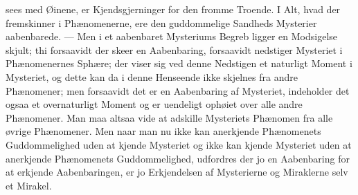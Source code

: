 \documentclass[12pt]{book}
\begin{document}
sees med Øinene, er Kjendsgjerninger for den fromme Troende. I Alt, hvad der
fremskinner i Phænomenerne, ere den guddommelige Sandheds Mysterier
aabenbarede. --- Men i et aabenbaret Mysteriums Begreb ligger en Modsigelse
skjult; thi forsaavidt der skeer en Aabenbaring, forsaavidt nedstiger
Mysteriet i Phænomenernes Sphære; der viser sig ved denne Nedstigen et
naturligt Moment i Mysteriet, og dette kan da i denne Henseende ikke skjelnes
fra andre Phænomener; men forsaavidt det er en Aabenbaring af Mysteriet,
indeholder det ogsaa et overnaturligt Moment og er uendeligt ophøiet over
alle andre Phænomener. Man maa altsaa vide at adskille Mysteriets Phænomen
fra alle øvrige Phænomener. Men naar man nu ikke kan anerkjende Phænomenets
Guddommelighed uden at kjende Mysteriet og ikke kan kjende Mysteriet uden at
anerkjende Phænomenets Guddommelighed, udfordres der jo en Aabenbaring for at
erkjende Aabenbaringen, er jo Erkjendelsen af Mysterierne og Miraklerne selv
et Mirakel.
\end{document}
